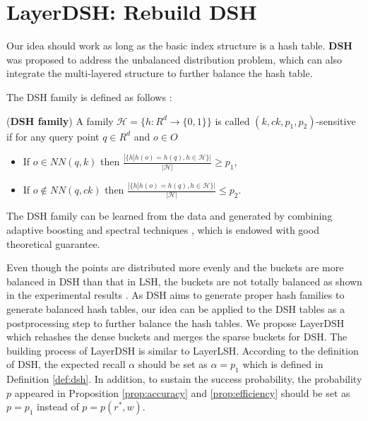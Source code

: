 \section{LayerDSH: Rebuild DSH}
\label{sec:recdsh}

Our idea should work as long as the basic index structure is a hash table. \textbf{DSH} \cite{Gao:2014:DDS:2588555.2588565} was proposed to address the unbalanced distribution problem, which can also integrate the multi-layered structure to further balance the hash table.


 The DSH family is defined as follows \cite{Gao:2014:DDS:2588555.2588565}:
\begin{definition}
\label{def:dsh}
(\textbf{DSH family}) A family $\mathcal{H}=\{h:R^d\rightarrow\{0,1\}\}$ is called $(k,ck,p_1,p_2)$-sensitive if for any query point $q\in R^d$ and $o\in O$
\begin{itemize}
  \item If $o\in NN(q,k)$ then $\frac{|\{h|h(o)=h(q),h\in\mathcal{H}\}|}{|\mathcal{H}|}\geq p_1$,
  \item If $o\notin NN(q,ck)$ then $\frac{|\{h|h(o)=h(q),h\in\mathcal{H}\}|}{|\mathcal{H}|}\leq p_2$.
\end{itemize}
\end{definition}
The DSH family can be learned from the data and generated by combining adaptive boosting and spectral techniques \cite{Gao:2014:DDS:2588555.2588565}, which is endowed with good theoretical guarantee.

Even though the points are distributed more evenly and the buckets are more balanced in DSH than that in LSH, the buckets are not totally balanced as shown in the experimental results \cite{Gao:2014:DDS:2588555.2588565}. As DSH aims to generate proper hash families to generate balanced hash tables, our idea can be applied to the DSH tables as a postprocessing step to further balance the hash tables. We propose LayerDSH which rehashes the dense buckets and merges the sparse buckets for DSH. The building process of LayerDSH is similar to LayerLSH. According to the definition of DSH, the expected recall $\alpha$ should be set as $\alpha=p_1$ which is defined in Definition \ref{def:dsh}. In addition, to sustain the success probability, the probability $p$ appeared in Proposition \ref{prop:accuracy} and \ref{prop:efficiency} should be set as $p=p_1$ instead of $p=p(r^*,w)$.

